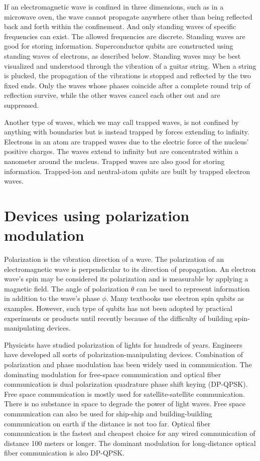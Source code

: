 \documentclass{ctexbook}
\begin{document}
If an electromagnetic wave is confined in three dimensions, such as in a microwave oven, the wave cannot propagate anywhere other than being reflected back and forth within the confinement. And only standing waves of specific frequencies can exist. The allowed frequencies are discrete. Standing waves are good for storing information. Superconductor qubits are constructed using standing waves of electrons, as described below. Standing waves may be best visualized and understood through the vibration of a guitar string. When a string is plucked, the propagation of the vibrations is stopped and reflected by the two fixed ends. Only the waves whose phases coincide after a complete round trip of reflection survive, while the other waves cancel each other out and are suppressed.

Another type of waves, which we may call trapped waves, is not confined by anything with boundaries but is instead trapped by forces extending to infinity. Electrons in an atom are trapped waves due to the electric force of the nucleus' positive charges. The waves extend to infinity but are concentrated within a nanometer around the nucleus. Trapped waves are also good for storing information. Trapped-ion and neutral-atom qubits are built by trapped electron waves.

\section{Devices using polarization modulation}
Polarization is the vibration direction of a wave. The polarization of an electromagnetic wave is perpendicular to its direction of propagation. An electron wave's spin may be considered its polarization and is measurable by applying a magnetic field. The angle of polarization $\theta$ can be used to represent information in addition to the wave's phase $\phi$. Many textbooks use electron spin qubits as examples. However, such type of qubits has not been adopted by practical experiments or products until recently\cite{nanotube} because of the difficulty of building spin-manipulating devices.

Physicists have studied polarization of lights for hundreds of years. Engineers have developed all sorts of polarization-manipulating devices. Combination of polarization and phase modulation has been widely used in communication. The dominating modulation for free-space communication and optical fiber communication is dual polarization quadrature phase shift keying (DP-QPSK). Free space communication is mostly used for satellite-satellite communication. There is no substance in space to degrade the power of light waves. Free space communication can also be used for ship-ship and building-building communication on earth if the distance is not too far. Optical fiber communication is the fastest and cheapest choice for any wired communication of distance 100 meters or longer. The dominant modulation for long-distance optical fiber communication is also DP-QPSK.
\end{document}
